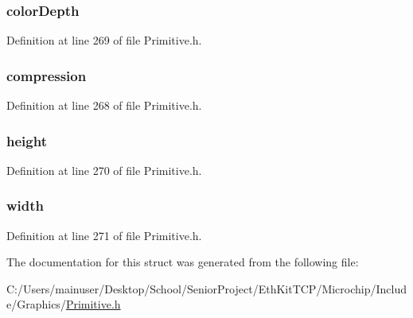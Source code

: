 \subsubsection[{color\+Depth}]{ color\+Depth}\label{struct_b_i_t_m_a_p___h_e_a_d_e_r_a0b8e695698df7a481e3759e313be9b4b}


Definition at line 269 of file Primitive.\+h.

\hypertarget{struct_b_i_t_m_a_p___h_e_a_d_e_r_afa5ab09f56b94d033995b498fee9c588}{}
\subsubsection[{compression}]{ compression}\label{struct_b_i_t_m_a_p___h_e_a_d_e_r_afa5ab09f56b94d033995b498fee9c588}


Definition at line 268 of file Primitive.\+h.

\hypertarget{struct_b_i_t_m_a_p___h_e_a_d_e_r_a446d0b29e07b5825c7bcfcbbde8e09dd}{}
\subsubsection[{height}]{ height}\label{struct_b_i_t_m_a_p___h_e_a_d_e_r_a446d0b29e07b5825c7bcfcbbde8e09dd}


Definition at line 270 of file Primitive.\+h.

\hypertarget{struct_b_i_t_m_a_p___h_e_a_d_e_r_a4c227e70da0634898f5d8b65b47b3d63}{}
\subsubsection[{width}]{ width}\label{struct_b_i_t_m_a_p___h_e_a_d_e_r_a4c227e70da0634898f5d8b65b47b3d63}


Definition at line 271 of file Primitive.\+h.



The documentation for this struct was generated from the following file\+:\begin{DoxyCompactItemize}
\item 
C\+:/\+Users/mainuser/\+Desktop/\+School/\+Senior\+Project/\+Eth\+Kit\+T\+C\+P/\+Microchip/\+Include/\+Graphics/\hyperlink{_primitive_8h}{Primitive.\+h}\end{DoxyCompactItemize}
